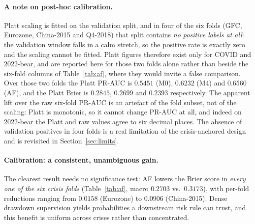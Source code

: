 \documentclass[11pt,a4paper]{article}
\newcommand{\prauc}{\mbox{PR-AUC}}
\begin{document}
\paragraph{A note on post-hoc calibration.} Platt scaling is fitted on the
validation split, and in four of the six folds (GFC, Eurozone, China-2015 and
Q4-2018) that split contains \emph{no positive labels at all}: the validation
window falls in a calm stretch, so the positive rate is exactly zero and the
scaling cannot be fitted. Platt figures therefore exist only for COVID and
2022-bear, and are reported here for those two folds alone rather than beside
the six-fold columns of Table~\ref{tab:af}, where they would invite a false
comparison. Over those two folds the Platt $\prauc$ is $0.5451$ (M0), $0.6232$
(M4) and $0.6560$ (AF), and the Platt Brier is $0.2845$, $0.2699$ and $0.2393$
respectively. The apparent lift over the raw six-fold $\prauc$ is an artefact
of the fold subset, not of the scaling: Platt is monotonic, so it cannot change
$\prauc$ at all, and indeed on 2022-bear the Platt and raw values agree to six
decimal places. The absence of validation positives in four folds is a real
limitation of the crisis-anchored design and is revisited in
Section~\ref{sec:limits}.

\paragraph{Calibration: a consistent, unambiguous gain.} The clearest result
needs no significance test: AF lowers the Brier score in \emph{every one of
the six crisis folds} (Table~\ref{tab:af}, macro $0.2703$ vs.\ $0.3173$), with
per-fold reductions ranging from $0.0158$ (Eurozone) to $0.0906$
(China-2015). Dense drawdown supervision yields probabilities a downstream risk
rule can trust, and this benefit is uniform across crises rather than
concentrated.
\end{document}
